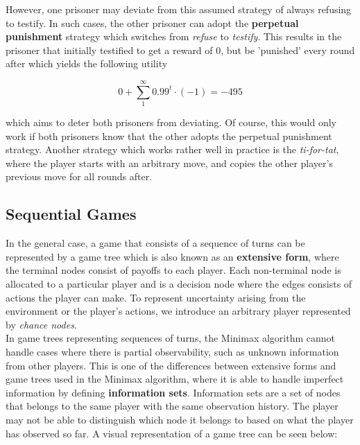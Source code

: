 \documentclass[11pt]{article}
\begin{document}
However, one prisoner may deviate from this assumed strategy of always refusing to testify. In such cases, the other prisoner can adopt the \textbf{perpetual punishment} strategy which switches from \textit{refuse} to \textit{testify}. This results in the prisoner that initially testified to get a reward of 0, but be 'punished' every round after which yields the following utility

$$
0 + \sum^{\infty}_{1} 0.99^t \cdot (-1) = -495
$$

which aims to deter both prisoners from deviating. Of course, this would only work if both prisoners know that the other adopts the perpetual punishment strategy. Another strategy which works rather well in practice is the \textit{ti-for-tat}, where the player starts with an arbitrary move, and copies the other player's previous move for all rounds after.

\subsection{Sequential Games}

In the general case, a game that consists of a sequence of turns can be represented by a game tree which is also known as an \textbf{extensive form}, where the terminal nodes consist of payoffs to each player. Each non-terminal node is allocated to a particular player and is a decision node where the edges consists of actions the player can make. To represent uncertainty arising from the environment or the player's actions, we introduce an arbitrary player represented by \textit{chance nodes}.\\

In game trees representing sequences of turns, the Minimax algorithm cannot handle cases where there is partial observability, such as unknown information from other players. This is one of the differences between extensive forms and game trees used in the Minimax algorithm, where it is able to handle imperfect information by defining \textbf{information sets}. Information sets are a set of nodes that belongs to the same player with the same observation history. The player may not be able to distinguish which node it belongs to based on what the player has observed so far. A visual representation of a game tree can be seen below:
\end{document}
